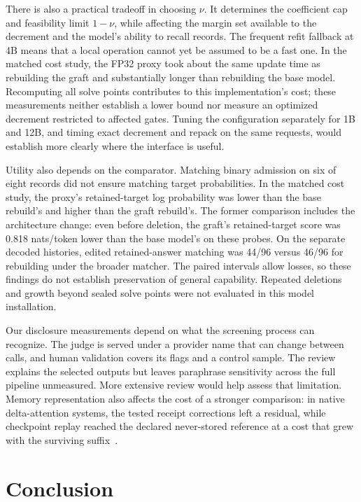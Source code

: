 There is also a practical tradeoff in choosing \(\nu\). It determines the
coefficient cap and feasibility limit \(1-\nu\), while affecting the margin
set available to the decrement and the model's ability to recall records.
The frequent refit fallback at 4B means that a local operation cannot yet be
assumed to be a fast one. In the matched cost study, the FP32 proxy took about
the same update time as rebuilding the graft and substantially longer than
rebuilding the base model. Recomputing all solve points contributes to this
implementation's cost; these measurements neither establish a lower bound nor
measure an optimized decrement restricted to affected gates. Tuning the
configuration separately for 1B and 12B, and timing exact decrement and repack
on the same requests, would establish more clearly where the interface is useful.

Utility also depends on the comparator. Matching binary admission on six of
eight records did not ensure matching target probabilities. In the matched
cost study, the proxy's retained-target log probability was lower than the base
rebuild's and higher than the graft rebuild's. The former comparison includes
the architecture change: even before deletion, the graft's retained-target
score was 0.818 nats/token lower than the base model's on these probes. On the
separate decoded histories, edited retained-answer matching was 44/96 versus
46/96 for rebuilding under the broader matcher. The paired intervals allow
losses, so these findings do not establish preservation of general capability.
Repeated deletions and growth beyond sealed solve points were not evaluated
in this model installation.

Our disclosure measurements depend on what the screening process can
recognize. The judge is served under a provider name that can change between
calls, and human validation covers its flags and a control sample. The
review explains the selected outputs but leaves paraphrase sensitivity
across the full pipeline unmeasured. More extensive review would help assess
that limitation. Memory representation also affects the cost of a stronger
comparison: in native delta-attention systems, the tested receipt corrections
left a residual, while checkpoint replay reached the declared never-stored
reference at a cost that grew with the surviving suffix~\citep{kdaomission}.

\section{Conclusion}

